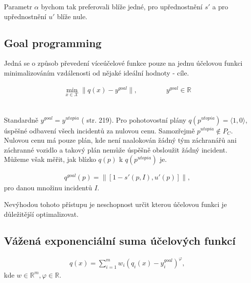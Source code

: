 Parametr $\alpha$ bychom tak preferovali blíže jedné, pro upřednostnění $s'$ a pro upřednostnění $u'$ blíže nule.

\subsection{Goal programming}\label{kap:goalP}

Jedná se o způsob převedení víceúčelové funkce pouze na jednu účelovou funkci minimalizováním vzdálenosti od nějaké ideální hodnoty - cíle. 

\begin{definice}
  \begin{align*}
    \min_{x \in \mathcal{X}} \| q(x) - y^{goal} \|, \hspace{50pt} y^{goal} \in \mathbb{R}
  \end{align*}
  \\
\end{definice}

Standardně $y^{goal} = y^{utopia}$ (\cite{AlgOptBook} str. 219).
Pro pohotovostní plány $q(p^{utopia}) = \langle 1, 0 \rangle$, úspěšné odbavení všech incidentů za nulovou cenu.
Samozřejmě $p^{utopia} \not \in P_C$.
Nulovou cenu má pouze plán, kde není naalokován žádný tým záchranářů ani záchranné vozidlo a takový plán nemůže úspěšně obsloužit žádný incident. 
Můžeme však měřit, jak blízko $q(p)$ k $q(p^{utopia})$ je.

\begin{definice}
  \begin{align*}
    q^{goal}(p) = \| [1 - s'(p, I), u'(p)] \|,
  \end{align*}
  pro danou množinu incidentů $I$.
  \\
\end{definice}

Nevýhodou tohoto přístupu je neschopnost určit kterou účelovou funkci je důležitější optimalizovat.

\subsection{Vážená exponenciální suma účelových funkcí}\label{kap:vazenaSumUcF}

\begin{definice}
  \begin{align*}
    q(x) = \sum_{i=1}^{m} w_i (q_i(x) - y_i^{goal})^\varphi,
  \end{align*}
  kde $w \in \mathbb{R}^m, \varphi \in \mathbb{R}$.
  \\
\end{definice}

